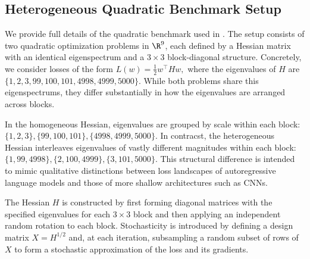 \documentclass[11pt, a4paper, twocolumn, copyright, goog]{google}
\theoremstyle{plain}
\theoremstyle{definition}
\theoremstyle{remark}
\begin{document}
\subsection{Heterogeneous Quadratic Benchmark Setup} \label{appx:hetero_quad_setup}
We provide full details of the quadratic benchmark used in \citet{orvieto2025search}.
The setup consists of two quadratic optimization problems in $\R^9$, each defined by a Hessian matrix with an identical eigenspectrum and a $3 \times 3$ block-diagonal structure. 
Concretely, we consider losses of the form $L(w) = \frac{1}{2}w^\top Hw,$ where the eigenvalues of $H$ are $\{1, 2,3, 99, 100, 101, 4998, 4999, 5000\}$. 
While both problems share this eigenspectrums, they differ substantially in how the eigenvalues are arranged across blocks. 

In the homogeneous Hessian, eigenvalues are grouped by scale within each block: $\{1,2,3\}, \{99, 100, 101\}, \{4998, 4999, 5000 \}$.
In contracst, the heterogeneous Hessian interleaves eigenvalues of vastly different magnitudes within each block: $\{1,99, 4998\}, \{2, 100, 4999 \}, \{3, 101, 5000 \}$. 
This structural difference is intended to mimic qualitative distinctions between loss landscapes of autoregressive language models and those of more shallow architectures such as CNNs. 

The Hessian $H$ is constructed by first forming diagonal matrices with the specified eigenvalues for each $3\times3$ block and then applying an independent random rotation to each block. 
Stochasticity is introduced by defining a design matrix $X = H^{1/2}$ and, at each iteration, subsampling a random subset of rows of $X$ to form a stochastic approximation of the loss and its gradients.
\end{document}
